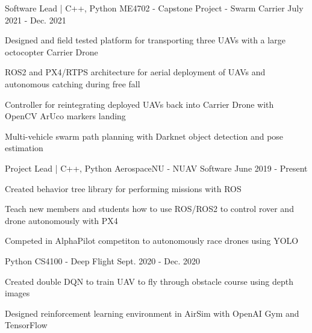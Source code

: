 
\begin{cventries}
  \cventry
    {Software Lead | C++, Python} %
    {ME4702 - Capstone Project - Swarm Carrier} %
    {} %
    {July 2021 - Dec. 2021} %
    {
      \begin{cvitems} %
        \item {Designed and field tested platform for transporting three UAVs with a large octocopter Carrier Drone}
        \item {ROS2 and PX4/RTPS architecture for aerial deployment of UAVs and autonomous catching during free fall}
        \item {Controller for reintegrating deployed UAVs back into Carrier Drone with OpenCV ArUco markers landing}
        \item {Multi-vehicle swarm path planning with Darknet object detection and pose estimation}
      \end{cvitems}
    }

  \cventry
    {Project Lead | C++, Python} %
    {AerospaceNU - NUAV Software} %
    {} %
    {June 2019 - Present} %
    {
      \begin{cvitems} %
        \item {Created behavior tree library for performing missions with ROS}
        \item {Teach new members and students how to use ROS/ROS2 to control rover and drone autonomously with PX4}
        \item {Competed in AlphaPilot competiton to autonomously race drones using YOLO}
      \end{cvitems}
    }

  \cventry
    {Python} %
    {CS4100 - Deep Flight} %
    {} %
    {Sept. 2020 - Dec. 2020} %
    {
      \begin{cvitems} %
        \item {Created double DQN to train UAV to fly through obstacle course using depth images}
        \item {Designed reinforcement learning environment in AirSim with OpenAI Gym and TensorFlow}
      \end{cvitems}
    }


\end{cventries}
